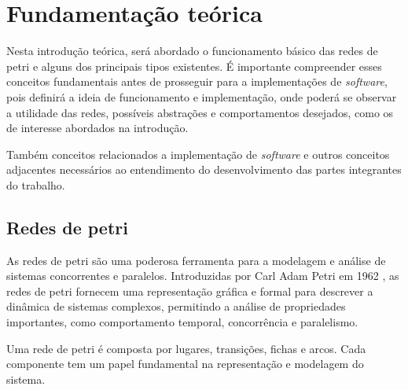 \chapter{Fundamentação teórica}

Nesta introdução teórica, será abordado o funcionamento básico das redes de petri e alguns dos principais tipos existentes. É importante compreender esses conceitos fundamentais antes de prosseguir para a implementações de \textit{software}, pois definirá a ideia de funcionamento e implementação, onde poderá se observar a utilidade das redes, possíveis abstrações e comportamentos desejados, como os de interesse abordados na introdução. 

Também conceitos relacionados a implementação de \textit{software} e outros conceitos adjacentes necessários ao entendimento do desenvolvimento das partes integrantes do trabalho.

\section{Redes de petri}

As redes de petri são uma poderosa ferramenta para a modelagem e análise de sistemas concorrentes e paralelos. Introduzidas por Carl Adam Petri em 1962 \cite{carlpetri}, as redes de petri fornecem uma representação gráfica e formal para descrever a dinâmica de sistemas complexos, permitindo a análise de propriedades importantes, como comportamento temporal, concorrência e paralelismo.

Uma rede de petri é composta por lugares, transições, fichas e arcos. Cada componente tem um papel fundamental na representação e modelagem do sistema.

